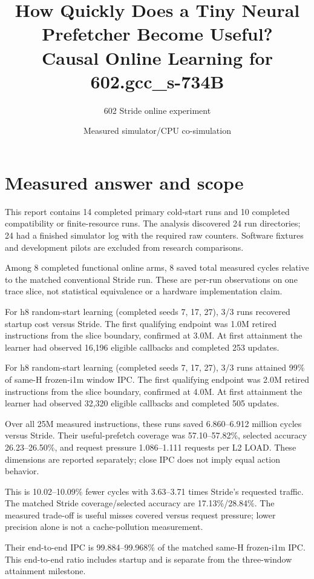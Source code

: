 \documentclass[10pt]{article}
\title{How Quickly Does a Tiny Neural Prefetcher Become Useful?\\\large Causal Online Learning for 602.gcc\_s-734B}
\author{602 Stride online experiment}
\date{Measured simulator/CPU co-simulation}
\begin{document}
\maketitle


\section{Measured answer and scope}

This report contains 14 completed primary cold-start runs and 10 completed compatibility or finite-resource runs. The analysis discovered 24 run directories; 24 had a finished simulator log with the required raw counters. Software fixtures and development pilots are excluded from research comparisons.

Among 8 completed functional online arms, 8 saved total measured cycles relative to the matched conventional Stride run. These are per-run observations on one trace slice, not statistical equivalence or a hardware implementation claim.

For h8 random-start learning (completed seeds 7, 17, 27), 3/3 runs recovered startup cost versus Stride. The first qualifying endpoint was 1.0M retired instructions from the slice boundary, confirmed at 3.0M. At first attainment the learner had observed 16,196 eligible callbacks and completed 253 updates.

For h8 random-start learning (completed seeds 7, 17, 27), 3/3 runs attained 99\% of same-H frozen-i1m window IPC. The first qualifying endpoint was 2.0M retired instructions from the slice boundary, confirmed at 4.0M. At first attainment the learner had observed 32,320 eligible callbacks and completed 505 updates.

Over all 25M measured instructions, these runs saved 6.860--6.912 million cycles versus Stride. Their useful-prefetch coverage was 57.10--57.82\%, selected accuracy 26.23--26.50\%, and request pressure 1.086--1.111 requests per L2 LOAD. These dimensions are reported separately; close IPC does not imply equal action behavior.

This is 10.02--10.09\% fewer cycles with 3.63--3.71 times Stride's requested traffic. The matched Stride coverage/selected accuracy are 17.13\%/28.84\%. The measured trade-off is useful misses covered versus request pressure; lower precision alone is not a cache-pollution measurement.

Their end-to-end IPC is 99.884--99.968\% of the matched same-H frozen-i1m IPC. This end-to-end ratio includes startup and is separate from the three-window attainment milestone.
\end{document}
